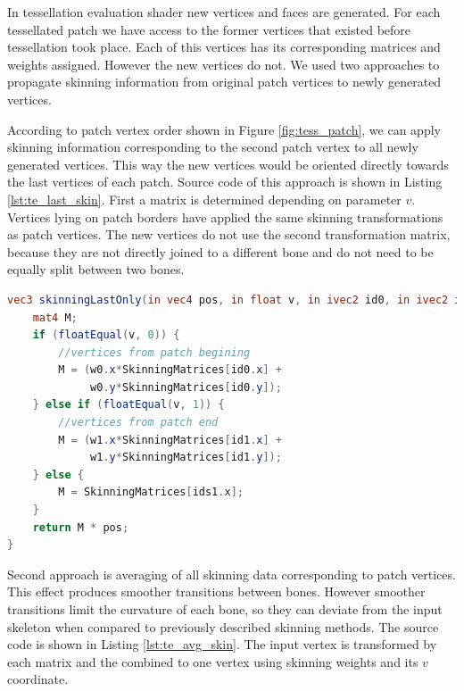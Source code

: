 In tessellation evaluation shader new vertices and faces are generated.
For each tessellated patch we have access to the former vertices that existed before tessellation took place.
Each of this vertices has its corresponding matrices and weights assigned.
However the new vertices do not.
We used two approaches to propagate skinning information from original patch vertices to newly generated vertices.

According to patch vertex order shown in Figure \ref{fig:tess_patch}, we can apply skinning information corresponding to the second patch vertex to all newly generated vertices.
This way the new vertices would be oriented directly towards the last vertices of each patch.
Source code of this approach is shown in Listing \ref{lst:te_last_skin}.
First a matrix is determined depending on parameter $v$.
Vertices lying on patch borders have applied the same skinning transformations as patch vertices.
The new vertices do not use the second transformation matrix, because they are not directly joined to a different bone and do not need to be equally split between two bones.

\linespread{1.2}
\begin{lstlisting}[language=GLSL,caption={Linear Blend Skinning implemented in tessellation evaluation shader, using only skinning information from the first patch vertex.},label={lst:te_last_skin}]
vec3 skinningLastOnly(in vec4 pos, in float v, in ivec2 id0, in ivec2 id1, in vec2 w0, in vec2 w1, in mat4 SkinningMatrices[SKINNING_MATRICES]) {
	mat4 M;
	if (floatEqual(v, 0)) {
		//vertices from patch begining
		M = (w0.x*SkinningMatrices[id0.x] +
			 w0.y*SkinningMatrices[id0.y]);
	} else if (floatEqual(v, 1)) {
		//vertices from patch end
		M = (w1.x*SkinningMatrices[id1.x] +
			 w1.y*SkinningMatrices[id1.y]);
	} else {
		M = SkinningMatrices[ids1.x];
	}
	return M * pos;
}
\end{lstlisting} 
\linespread{1.5}

Second approach is averaging of all skinning data corresponding to patch vertices.
This effect produces smoother transitions between bones.
However smoother transitions limit the curvature of each bone, so they can deviate from the input skeleton when compared to previously described skinning methods.
The source code is shown in Listing \ref{lst:te_avg_skin}.
The input vertex is transformed by each matrix and the combined to one vertex using skinning weights and its $v$ coordinate.

